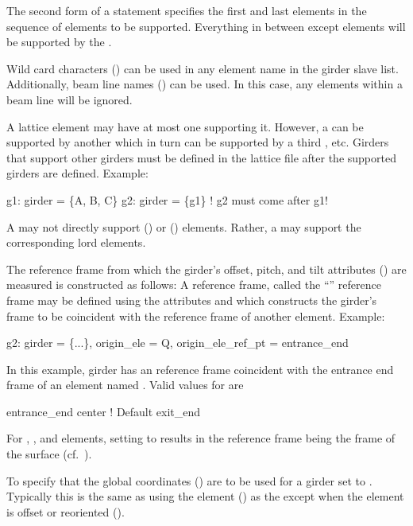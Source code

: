 The second form of a  statement specifies the first and last elements in the sequence of
elements to be supported. Everything in between except  elements will be supported by the
.

Wild card characters () can be used in any element name in the girder slave
list. Additionally, beam line names () can be used. In this case, any
 elements within a beam line will be ignored.

A lattice element may have at most one  supporting it. However, a  can be
supported by another  which in turn can be supported by a third , etc. Girders
that support other girders must be defined in the lattice file after the supported girders are
defined. Example:
\begin{example}
  g1: girder = \{A, B, C\}
  g2: girder = \{g1\}      ! g2 must come after g1!
\end{example}

A  may not directly support  () or 
() elements. Rather, a  may support the corresponding lord elements.

The reference frame from which the girder's offset, pitch, and tilt attributes () are
measured is constructed as follows: A reference frame, called the ``'' reference frame
may be defined using the attributes  and  which constructs the
girder's  frame to be coincident with the reference frame of another element. Example:
\begin{example}
  g2: girder = \{...\}, origin_ele = Q, origin_ele_ref_pt = entrance_end
\end{example}
In this example, girder  has an  reference frame coincident with the entrance end
frame of an element named . Valid values for  are
\begin{example}
  entrance_end
  center        ! Default
  exit_end
\end{example}
For , , and  elements, setting 
to  results in the reference frame being the frame of the surface (cf.~).

To specify that the global coordinates () are to be used for a girder set
 to . Typically this is the same as using the 
element () as the  except when the  element is offset
or reoriented ().

